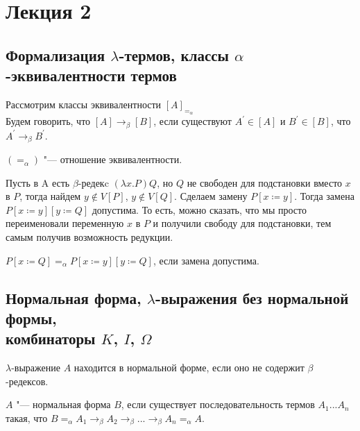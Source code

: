\section{Лекция 2}

\subsection{Формализация $\lambda$-термов, классы $\alpha$-эквивалентности термов}

\begin{definition}
	Рассмотрим классы эквивалентности $[A]_{=_{\alpha}}$ \\
	Будем говорить, что $[A]\to_{\beta}[B]$, если существуют $A^{'}\in [A]$ и $B^{'} \in [B]$, что $A^{'}\to_{\beta}B^{'}$.
\end{definition}

\begin{lemma}
	$(=_{\alpha})$ "--- отношение эквивалентности.
\end{lemma}

Пусть в A есть $\beta$-редекc $(\lambda{}x.P)Q$, но $Q$ не свободен для подстановки вместо $x$ в $P$,
тогда найдем $y\notin V[P]$, $y\notin V[Q]$. Сделаем замену $P[x\coloneqq{}y]$.
Тогда замена $P[x\coloneqq{}y][y\coloneqq{}Q]$ допустима. То есть, можно сказать, что мы просто переименовали переменную $x$ в $P$ и получили свободу для подстановки, тем самым получив возможность редукции.

\begin{lemma}
	$P[x\coloneqq{}Q]=_{\alpha}P[x\coloneqq{}y][y\coloneqq{}Q]$, если замена допустима.
\end{lemma}

\subsection{Нормальная форма, $\lambda$-выражения без нормальной формы, \\комбинаторы $K$, $I$, $\Omega$}

\begin{definition}
	$\lambda$-выражение $A$ находится в нормальной форме, если оно не содержит $\beta$-редексов.
\end{definition}

\begin{definition}
	$A$ "--- нормальная форма $B$, если существует последовательность термов $A_{1}...A_{n}$ такая, что $B=_{\alpha}A_{1}\to_{\beta}A_{2}\to_{\beta}...\to_{\beta}A_{n}=_{\alpha}A$.
\end{definition}

